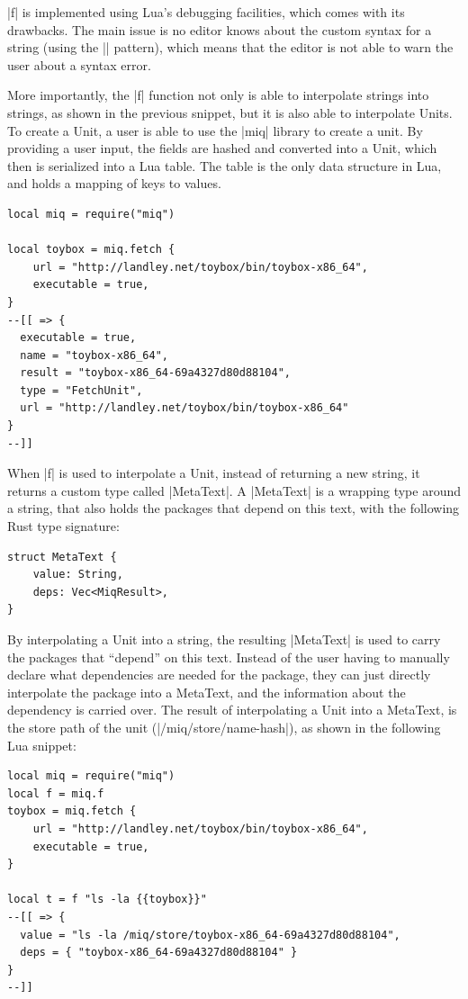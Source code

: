 |f| is implemented using Lua's debugging facilities, which
comes with its drawbacks. The main issue is no editor knows
about the custom syntax for a string (using the |{{}}|
pattern), which means that the editor is not able to warn
the user about a syntax error.

More importantly, the |f| function not only is able to
interpolate strings into strings, as shown in the previous
snippet, but it is also able to interpolate Units. To create
a Unit, a user is able to use the |miq| library to create a
unit. By providing a user input, the fields are hashed and
converted into a Unit, which then is serialized into a Lua
table. The table is the only data structure in Lua, and
holds a mapping of keys to values.

\begin{verbatim}
local miq = require("miq")

local toybox = miq.fetch {
	url = "http://landley.net/toybox/bin/toybox-x86_64",
	executable = true,
}
--[[ => {
  executable = true,
  name = "toybox-x86_64",
  result = "toybox-x86_64-69a4327d80d88104",
  type = "FetchUnit",
  url = "http://landley.net/toybox/bin/toybox-x86_64"
}
--]]
\end{verbatim}

When |f| is used to interpolate a Unit, instead of returning
a new string, it returns a custom type called |MetaText|. A
|MetaText| is a wrapping type around a string, that also
holds the packages that depend on this text, with the
following Rust type signature:

\begin{verbatim}
struct MetaText {
    value: String,
    deps: Vec<MiqResult>,
}
\end{verbatim}

By interpolating a Unit into a string, the resulting
|MetaText| is used to carry the packages that ``depend'' on
this text. Instead of the user having to manually declare
what dependencies are needed for the package, they can just
directly interpolate the package into a MetaText, and the
information about the dependency is carried over. The result
of interpolating a Unit into a MetaText, is the store path
of the unit (|/miq/store/name-hash|), as shown in the
following Lua snippet:

\begin{verbatim}
local miq = require("miq")
local f = miq.f
toybox = miq.fetch {
    url = "http://landley.net/toybox/bin/toybox-x86_64",
    executable = true,
}

local t = f "ls -la {{toybox}}"
--[[ => {
  value = "ls -la /miq/store/toybox-x86_64-69a4327d80d88104",
  deps = { "toybox-x86_64-69a4327d80d88104" }
}
--]]
\end{verbatim}

